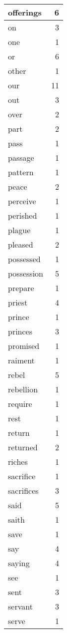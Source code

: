 \begin{center}
\begin{longtable}{l|r}
offerings & 6\\ \hline 
on & 3\\ \hline 
one & 1\\ \hline 
or & 6\\ \hline 
other & 1\\ \hline 
our & 11\\ \hline 
out & 3\\ \hline 
over & 2\\ \hline 
part & 2\\ \hline 
pass & 1\\ \hline 
passage & 1\\ \hline 
pattern & 1\\ \hline 
peace & 2\\ \hline 
perceive & 1\\ \hline 
perished & 1\\ \hline 
plague & 1\\ \hline 
pleased & 2\\ \hline 
possessed & 1\\ \hline 
possession & 5\\ \hline 
prepare & 1\\ \hline 
priest & 4\\ \hline 
prince & 1\\ \hline 
princes & 3\\ \hline 
promised & 1\\ \hline 
raiment & 1\\ \hline 
rebel & 5\\ \hline 
rebellion & 1\\ \hline 
require & 1\\ \hline 
rest & 1\\ \hline 
return & 1\\ \hline 
returned & 2\\ \hline 
riches & 1\\ \hline 
sacrifice & 1\\ \hline 
sacrifices & 3\\ \hline 
said & 5\\ \hline 
saith & 1\\ \hline 
save & 1\\ \hline 
say & 4\\ \hline 
saying & 4\\ \hline 
see & 1\\ \hline 
sent & 3\\ \hline 
servant & 3\\ \hline 
serve & 1\\ \hline 

\end{longtable}
\end{center}
